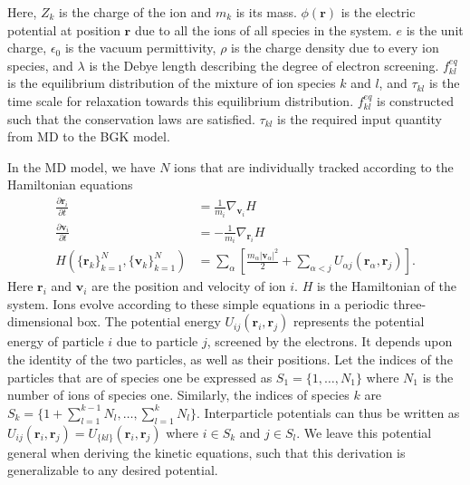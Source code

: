 \documentclass{article}
\begin{document}
Here, $Z_k$ is the charge of the ion and $m_k$ is its mass. $\phi(\mathbf{r})$ is the electric potential at position $\mathbf{r}$ due to all the ions of all species in the system. $e$ is the unit charge, $\epsilon_0$ is the vacuum permittivity, $\rho$ is the charge density due to every ion species, and $\lambda$ is the Debye length describing the degree of electron screening. $f_{kl}^{eq}$ is the equilibrium distribution of the mixture of ion species $k$ and $l$, and $\tau_{kl}$ is the time scale for relaxation towards this equilibrium distribution. $f_{kl}^{eq}$ is constructed such that the conservation laws are satisfied. $\tau_{kl}$ is the required input quantity from MD to the BGK model.

In the MD model, we have $N$ ions that are individually tracked according to the Hamiltonian equations
\begin{equation}
\begin{split}
\frac{\partial \mathbf{r}_i}{\partial t}&=\frac{1}{m_i}\nabla_{\mathbf{v}_i} H\\
\frac{\partial \mathbf{v}_i}{\partial t}&=-\frac{1}{m_i}\nabla_{\mathbf{r}_i}H\\
H(\{\mathbf{r}_k\}_{k=1}^N,\{\mathbf{v}_k\}_{k=1}^N)&=\sum_\alpha\left[\frac{m_\alpha|\mathbf{v}_\alpha|^2}{2}+\sum_{\alpha<j}U_{\alpha j}(\mathbf{r}_\alpha,\mathbf{r}_j)\right].
\end{split}\label{eq:MD}
\end{equation}
Here $\mathbf{r}_i$ and $\mathbf{v}_i$ are the position and velocity of ion $i$. $H$ is the Hamiltonian of the system. Ions evolve according to these simple equations in a periodic three-dimensional box. The potential energy $U_{ij}(\mathbf{r}_i,\mathbf{r}_j)$ represents the potential energy of particle $i$ due to particle $j$, screened by the electrons. It depends upon the identity of the two particles, as well as their positions. Let the indices of the particles that are of species one be expressed as $S_1=\{1,\dots, N_1\}$ where $N_1$ is the number of ions of species one. Similarly, the indices of species $k$ are $S_k=\{1+\sum_{l=1}^{k-1} N_l,\dots,\sum_{l=1}^kN_l\}$. Interparticle potentials can thus be written as $U_{ij}(\mathbf{r}_i,\mathbf{r}_j)=U_{\{kl\}}(\mathbf{r}_i,\mathbf{r}_j)$ where $i\in S_k$ and $j\in S_l$.  We leave this potential general when deriving the kinetic equations, such that this derivation is generalizable to any desired potential. 
\end{document}
